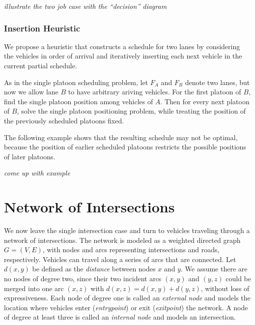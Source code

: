 \documentclass{article}
\theoremstyle{definition}
\theoremstyle{plain}
\begin{document}
\noindent
\textit{\textit{\color{blue}illustrate the two job case with the ``decision'' diagram}}

\subsubsection{Insertion Heuristic}

We propose a heuristic that constructs a schedule for two lanes by considering
the vehicles in order of arrival and iteratively inserting each next vehicle in
the current partial schedule.

As in the single platoon scheduling problem, let $F_{A}$ and $F_{B}$ denote two
lanes, but now we allow lane $B$ to have arbitrary ariving vehicles. For the
first platoon of $B$, find the single platoon position among vehicles of $A$.
Then for every next platoon of $B$, solve the single platoon positioning
problem, while treating the position of the previously scheduled platoons fixed.


The following example shows that the resulting schedule may not be optimal,
because the position of earlier scheduled platoons restricts the possible
positions of later platoons.
\begin{eg}
  \textit{\color{blue}come up with example}
\end{eg}


\newpage

\section{Network of Intersections}

We now leave the single intersection case and turn to vehicles traveling through
a network of intersections. The network is modeled as a weighted directed graph
$G=(V,E)$, with nodes and arcs representing intersections and roads,
respectively. Vehicles can travel along a series of arcs that are connected. Let
$d(x,y)$ be defined as the \textit{distance} between nodes $x$ and $y$. We
assume there are no nodes of degree two, since their two incident arcs $(x,y)$
and $(y,z)$ could be merged into one arc $(x,z)$ with
$d(x,z) = d(x,y) + d(y,z)$, without loss of expressiveness. Each node of degree
one is called an \textit{external node} and models the location where vehicles
enter (\textit{entrypoint}) or exit (\textit{exitpoint}) the network. A node of
degree at least three is called an \textit{internal node} and models an
intersection.
\end{document}

